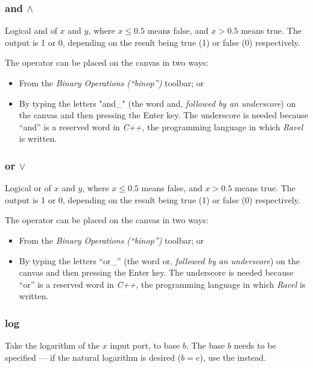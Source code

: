 \subsubsection{and $\wedge$}


\label{Operation:and_} Logical and of $x$ and $y$, where $x\le0.5$
means false, and $x>0.5$ means true. The output is 1 or 0, depending
on the result being true (1) or false (0) respectively.

The operator can be placed on the canvas in two ways:
\begin{itemize}
\item From the \emph{Binary Operations (``binop'') }toolbar; or 
\item By typing the letters "and\_" (the word and, \emph{followed by an
underscore}) on the canvas and then pressing the Enter key. The underscore
is needed because ``and'' is a reserved word in \emph{C++,} the
programming language in which \emph{Ravel} is written.
\end{itemize}

\subsubsection{or $\vee$}


\label{Operation:or_} Logical or of $x$ and $y$, where $x\le0.5$
means false, and $x>0.5$ means true. The output is 1 or 0, depending
on the result being true (1) or false (0) respectively.

The operator can be placed on the canvas in two ways:
\begin{itemize}
\item From the \emph{Binary Operations (``binop'') }toolbar; or 
\item By typing the letters ``or\_'' (the word or, \emph{followed by an
underscore}) on the canvas and then pressing the Enter key. The underscore
is needed because ``or'' is a reserved word in \emph{C++,} the programming
language in which \emph{Ravel} is written.
\end{itemize}

\subsubsection{log}


\label{Operation:log} Take the logarithm of the $x$ input port,
to base $b$. The base $b$ needs to be specified --- if the natural
logarithm is desired ($b=e$), use the  instead.

